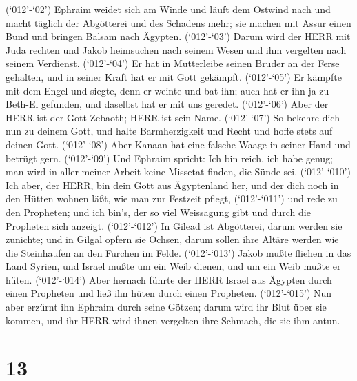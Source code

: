  (`012'-`02') Ephraim weidet sich am Winde und läuft dem
Ostwind nach und macht täglich der Abgötterei und des Schadens mehr; sie
machen mit Assur einen Bund und bringen Balsam nach Ägypten.
 (`012'-`03') Darum wird der HERR mit Juda rechten und Jakob
heimsuchen nach seinem Wesen und ihm vergelten nach seinem Verdienst.
 (`012'-`04') Er hat in Mutterleibe seinen Bruder an der
Ferse gehalten, und in seiner Kraft hat er mit Gott gekämpft.
 (`012'-`05') Er kämpfte mit dem Engel und siegte, denn er
weinte und bat ihn; auch hat er ihn ja zu Beth-El gefunden, und daselbst
hat er mit uns geredet.  (`012'-`06') Aber der HERR ist der
Gott Zebaoth; HERR ist sein Name.  (`012'-`07') So bekehre
dich nun zu deinem Gott, und halte Barmherzigkeit und Recht und hoffe
stets auf deinen Gott.  (`012'-`08') Aber Kanaan hat eine
falsche Waage in seiner Hand und betrügt gern.  (`012'-`09')
Und Ephraim spricht: Ich bin reich, ich habe genug; man wird in aller
meiner Arbeit keine Missetat finden, die Sünde sei. 
(`012'-`010') Ich aber, der HERR, bin dein Gott aus Ägyptenland her, und
der dich noch in den Hütten wohnen läßt, wie man zur Festzeit pflegt,
 (`012'-`011') und rede zu den Propheten; und ich bin's,
der so viel Weissagung gibt und durch die Propheten sich anzeigt.
 (`012'-`012') In Gilead ist Abgötterei, darum werden sie
zunichte; und in Gilgal opfern sie Ochsen, darum sollen ihre Altäre
werden wie die Steinhaufen an den Furchen im Felde. 
(`012'-`013') Jakob mußte fliehen in das Land Syrien, und Israel mußte
um ein Weib dienen, und um ein Weib mußte er hüten. 
(`012'-`014') Aber hernach führte der HERR Israel aus Ägypten durch
einen Propheten und ließ ihn hüten durch einen Propheten. 
(`012'-`015') Nun aber erzürnt ihn Ephraim durch seine Götzen; darum
wird ihr Blut über sie kommen, und ihr HERR wird ihnen vergelten ihre
Schmach, die sie ihm antun.

\hypertarget{section-12}{%
\section{13}\label{section-12}}

